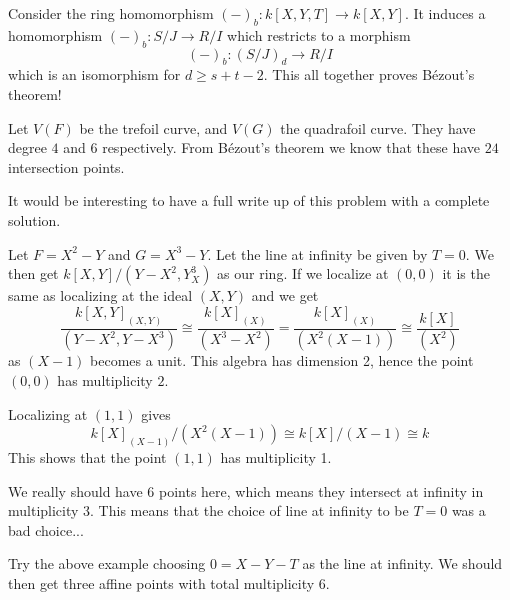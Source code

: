 Consider the ring homomorphism $(-)_b\colon k[X, Y, T]\longrightarrow k[X, Y]$. It induces a homomorphism $(-)_b\colon S/J\longrightarrow R/I$ which restricts to a morphism 
\begin{equation*}
    (-)_b\colon (S/J)_d \longrightarrow R/I
\end{equation*}
which is an isomorphism for $d\geq s+t-2$. 
% 
This all together proves Bézout's theorem!

\begin{example}
Let $V(F)$ be the trefoil curve, and $V(G)$ the quadrafoil curve. They have degree $4$ and $6$ respectively. From Bézout's theorem we know that these have $24$ intersection points. 
\end{example}

\begin{problem}
It would be interesting to have a full write up of this problem with a complete solution. 
\end{problem}

\begin{example}
Let $F=X^2-Y$ and $G=X^3-Y$. Let the line at infinity be given by $T=0$. We then get $k[X, Y]/(Y-X^2, Y_X^3)$ as our ring. If we localize at $(0,0)$ it is the same as localizing at the ideal $(X, Y)$ and we get 
\begin{equation*}
    \frac{k[X, Y]_{(X, Y)}}{(Y-X^2, Y-X^3)}\cong \frac{k[X]_{(X)}}{(X^3-X^2)} = \frac{k[X]_{(X)}}{(X^2(X-1))} \cong \frac{k[X]}{(X^2)}
\end{equation*}
as $(X-1)$ becomes a unit. This algebra has dimension 2, hence the point $(0,0)$ has multiplicity $2$. 

Localizing at $(1,1)$ gives
\begin{equation*}
    k[X]_{(X-1)}/(X^2(X-1))\cong k[X]/(X-1)\cong k
\end{equation*}
This shows that the point $(1,1)$ has multiplicity 1. 

We really should have 6 points here, which means they intersect at infinity in multiplicity 3. This means that the choice of line at infinity to be $T=0$ was a bad choice...
\end{example}

\begin{problem}
Try the above example choosing $0=X-Y-T$ as the line at infinity. We should then get three affine points with total multiplicity 6. 
\end{problem}
